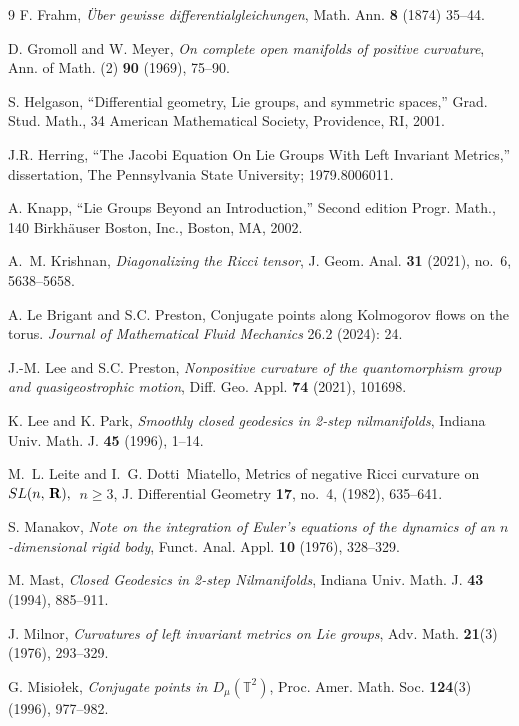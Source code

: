 \documentclass[oneside, 11pt]{amsart}
\numberwithin{equation}{section}
\begin{document}
\begin{thebibliography}{9}
F. Frahm, \emph{\"Uber gewisse differentialgleichungen}, Math. Ann. \textbf{8} (1874) 35--44.

D. Gromoll and W. Meyer, \emph{On complete open manifolds of positive curvature}, Ann. of Math. (2) \textbf{90} (1969), 75--90.

S. Helgason, ``Differential geometry, Lie groups, and symmetric spaces,'' Grad. Stud. Math., 34 American Mathematical Society, Providence, RI, 2001. %

J.R. Herring, ``The Jacobi Equation On Lie Groups With Left Invariant Metrics,'' dissertation, The Pennsylvania State University; 1979.8006011.

A. Knapp, ``Lie Groups Beyond an Introduction,'' Second edition Progr. Math., 140 Birkh\"auser Boston, Inc., Boston, MA, 2002. %

A.~M. Krishnan, \emph{Diagonalizing the Ricci tensor}, J. Geom. Anal. {\bf 31} (2021), no.~6, 5638--5658.

A. Le Brigant and S.C. Preston, Conjugate points along Kolmogorov flows on the torus. \emph{Journal of Mathematical Fluid Mechanics} 26.2 (2024): 24.

J.-M. Lee and S.C. Preston, \emph{Nonpositive curvature of the quantomorphism group and quasigeostrophic motion}, Diff. Geo. Appl. \textbf{74} (2021), 101698. 

K. Lee and K. Park, \emph{Smoothly closed geodesics in 2-step nilmanifolds}, Indiana Univ. Math. J. \textbf{45} (1996), 1--14.

M.~L. Leite and I.~G. Dotti~Miatello, Metrics of negative Ricci curvature on ${\rm SL}(n,\,{\bf R}),$\ $n\geq 3$, J. Differential Geometry {\bf 17}, no.~4, (1982), 635--641.

S. Manakov, \emph{Note on the integration of Euler’s equations of the dynamics of an $n$-dimensional rigid body}, Funct. Anal. Appl. \textbf{10} (1976), 328--329.

M. Mast, \emph{Closed Geodesics in 2-step Nilmanifolds}, Indiana Univ. Math. J. \textbf{43} (1994), 885--911.

J. Milnor, \emph{Curvatures of left invariant metrics on Lie groups}, Adv. Math. \textbf{21}(3) (1976), 293--329.

G. Misio\l ek, \emph{Conjugate points in $D_{\mu}(\mathbb{T}^2)$}, Proc. Amer. Math. Soc. \textbf{124}(3) (1996), 977--982.


\end{thebibliography}
\end{document}
